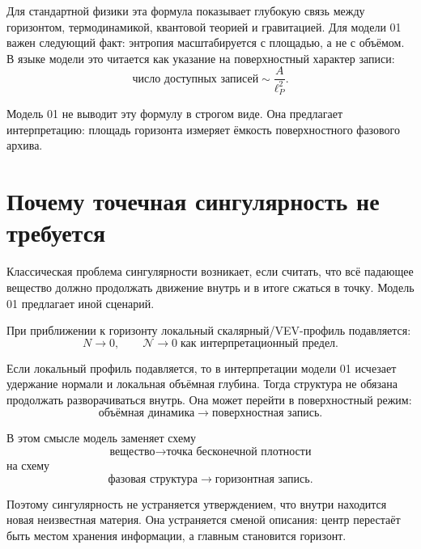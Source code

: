 \documentclass[11pt,a4paper]{article}
\newcommand{\normal}{\mathcal{N}}
\begin{document}
Для стандартной физики эта формула показывает глубокую связь между горизонтом, термодинамикой, квантовой теорией и гравитацией. Для модели 01 важен следующий факт: энтропия масштабируется с площадью, а не с объёмом. В языке модели это читается как указание на поверхностный характер записи:
\begin{equation}
\text{число доступных записей} \sim \frac{A}{\ell_P^2}.
\end{equation}

Модель 01 не выводит эту формулу в строгом виде. Она предлагает интерпретацию: площадь горизонта измеряет ёмкость поверхностного фазового архива.

\section{Почему точечная сингулярность не требуется}

Классическая проблема сингулярности возникает, если считать, что всё падающее вещество должно продолжать движение внутрь и в итоге сжаться в точку. Модель 01 предлагает иной сценарий.

При приближении к горизонту локальный скалярный/VEV-профиль подавляется:
\begin{equation}
N \to 0, \qquad \normal \to 0 \;\text{как интерпретационный предел}.
\end{equation}

Если локальный профиль подавляется, то в интерпретации модели 01 исчезает удержание нормали и локальная объёмная глубина. Тогда структура не обязана продолжать разворачиваться внутрь. Она может перейти в поверхностный режим:
\begin{equation}
\text{объёмная динамика} \longrightarrow \text{поверхностная запись}.
\end{equation}

В этом смысле модель заменяет схему
\begin{equation}
\text{вещество} \longrightarrow \text{точка бесконечной плотности}
\end{equation}
на схему
\begin{equation}
\text{фазовая структура} \longrightarrow \text{горизонтная запись}.
\end{equation}

Поэтому сингулярность не устраняется утверждением, что внутри находится новая неизвестная материя. Она устраняется сменой описания: центр перестаёт быть местом хранения информации, а главным становится горизонт.
\end{document}
